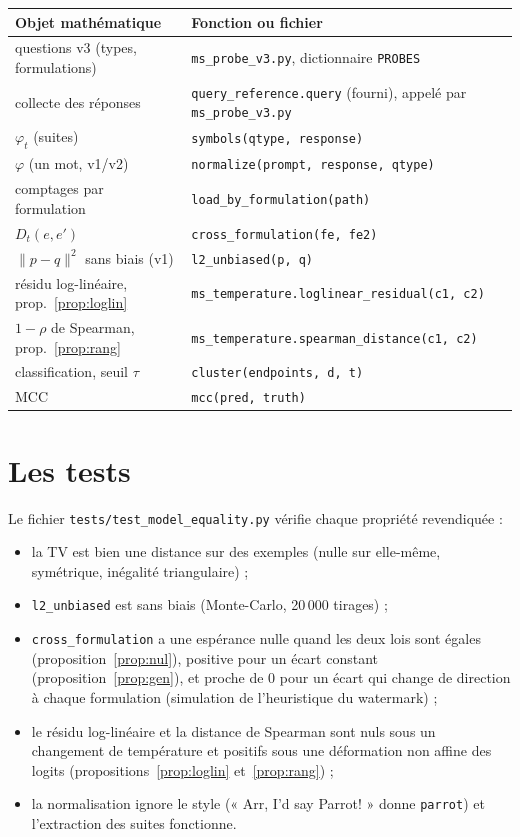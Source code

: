 \documentclass[11pt,a4paper]{report}
\theoremstyle{definition}
\theoremstyle{plain}
\newcommand{\code}[1]{\texttt{#1}}
\begin{document}
\begin{center}\small
\begin{tabular}{ll}
\toprule
Objet mathématique & Fonction ou fichier \\
\midrule
questions v3 (types, formulations) & \code{ms\_probe\_v3.py}, dictionnaire \code{PROBES} \\
collecte des réponses & \code{query\_reference.query} (fourni), appelé par \code{ms\_probe\_v3.py} \\
$\varphi_t$ (suites) & \code{symbols(qtype, response)} \\
$\varphi$ (un mot, v1/v2) & \code{normalize(prompt, response, qtype)} \\
comptages par formulation & \code{load\_by\_formulation(path)} \\
$D_t(e,e')$ & \code{cross\_formulation(fe, fe2)} \\
$\|p-q\|^2$ sans biais (v1) & \code{l2\_unbiased(p, q)} \\
résidu log-linéaire, prop.~\ref{prop:loglin} & \code{ms\_temperature.loglinear\_residual(c1, c2)} \\
$1-\rho$ de Spearman, prop.~\ref{prop:rang} & \code{ms\_temperature.spearman\_distance(c1, c2)} \\
classification, seuil $\tau$ & \code{cluster(endpoints, d, t)} \\
MCC & \code{mcc(pred, truth)} \\
\bottomrule
\end{tabular}
\end{center}

\section{Les tests}

Le fichier \code{tests/test\_model\_equality.py} vérifie chaque propriété revendiquée :
\begin{itemize}
  \item la TV est bien une distance sur des exemples (nulle sur elle-même, symétrique, inégalité triangulaire) ;
  \item \code{l2\_unbiased} est sans biais (Monte-Carlo, 20\,000 tirages) ;
  \item \code{cross\_formulation} a une espérance nulle quand les deux lois sont égales (proposition~\ref{prop:nul}), positive pour un écart constant (proposition~\ref{prop:gen}), et proche de 0 pour un écart qui change de direction à chaque formulation (simulation de l'heuristique du watermark) ;
  \item le résidu log-linéaire et la distance de Spearman sont nuls sous un changement de température et positifs sous une déformation non affine des logits (propositions~\ref{prop:loglin} et~\ref{prop:rang}) ;
  \item la normalisation ignore le style (« Arr, I'd say Parrot! » donne \code{parrot}) et l'extraction des suites fonctionne.
\end{itemize}
\end{document}
